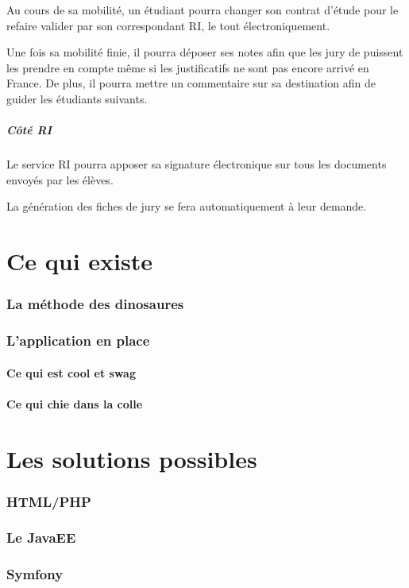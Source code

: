 \documentclass[10pt,a4paper]{article}
\begin{document}
		Au cours de sa mobilité, un étudiant pourra changer son contrat d'étude pour le refaire valider par son correspondant RI, le tout électroniquement.
		
		Une fois sa mobilité finie, il pourra déposer ses notes afin que les jury de puissent les prendre en compte même si les justificatifs ne sont pas encore arrivé en France. De plus, il pourra mettre un commentaire sur sa destination afin de guider les étudiants suivants.
		
		\subsubsection{Côté RI}
		
		Le service RI pourra apposer sa signature électronique sur tous les documents envoyés par les élèves.
		
		La génération des fiches de jury se fera automatiquement à leur demande.
	
	\part{Ce qui existe}
	
		\section{La méthode des dinosaures}
		
		\section{L'application en place}
			\subsection{Ce qui est cool et swag}
			\subsection{Ce qui chie dans la colle}
	
	\part{Les solutions possibles}
		
		\section{HTML/PHP}
		\section{Le JavaEE}
		\section{Symfony}
		
\end{document}
